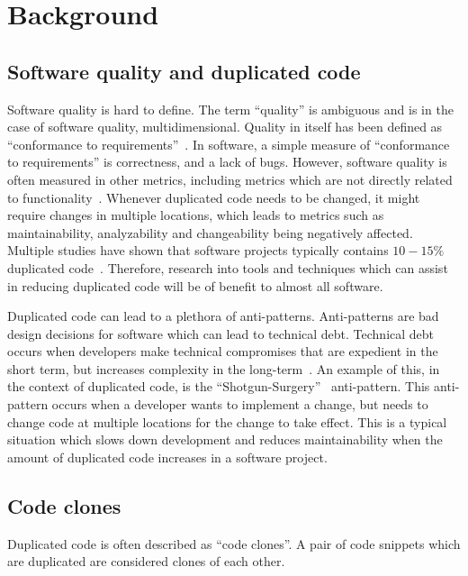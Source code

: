 \chapter{Background}


\section{Software quality and duplicated code}

Software quality is hard to define. The term ``quality'' is ambiguous and is in the case
of software quality, multidimensional. Quality in itself has been defined as ``conformance
to requirements''~\cite[8]{crosby1980quality}. In software, a simple measure of
``conformance to requirements'' is correctness, and a lack of bugs. However, software
quality is often measured in other metrics, including metrics which are not directly
related to functionality~\cite[29]{MetricsAndModelsInSoftwareQuality}. Whenever duplicated
code needs to be changed, it might require changes in multiple locations, which leads to
metrics such as maintainability, analyzability and changeability being negatively
affected. Multiple studies have shown that software projects typically contains $10-15\%$
duplicated code~\cite{CloningByAccident}. Therefore, research into tools and techniques
which can assist in reducing duplicated code will be of benefit to almost all software.

Duplicated code can lead to a plethora of anti-patterns. Anti-patterns are bad design
decisions for software which can lead to technical debt. Technical debt occurs when
developers make technical compromises that are expedient in the short term, but increases
complexity in the long-term~\cite[111]{TechnicalDebt}. An example of this, in the context
of duplicated code, is the ``Shotgun-Surgery''~\cite[66]{fowlerrefactoring} anti-pattern.
This anti-pattern occurs when a developer wants to implement a change, but needs to change
code at multiple locations for the change to take effect. This is a typical situation
which slows down development and reduces maintainability when the amount of duplicated
code increases in a software project.

\section{Code clones}

Duplicated code is often described as ``code clones''. A pair of code snippets which are
duplicated are considered clones of each other.


